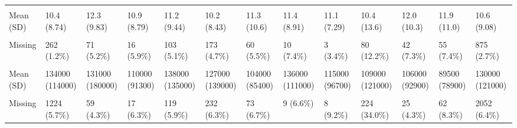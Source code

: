 \documentclass[
  single column]{article}
\begin{document}
\begin{landscape}
\begin{longtable}[t]{lllllllllllll}
\cellcolor{gray!10}{hours\_housework} & \cellcolor{gray!10}{} & \cellcolor{gray!10}{} & \cellcolor{gray!10}{} & \cellcolor{gray!10}{} & \cellcolor{gray!10}{} & \cellcolor{gray!10}{} & \cellcolor{gray!10}{} & \cellcolor{gray!10}{} & \cellcolor{gray!10}{} & \cellcolor{gray!10}{} & \cellcolor{gray!10}{} & \cellcolor{gray!10}{}\\
Mean (SD) & 10.4 (8.74) & 12.3 (9.83) & 10.9 (8.79) & 11.2 (9.44) & 10.2 (8.43) & 11.3 (10.6) & 11.4 (8.91) & 11.1 (7.29) & 10.4 (13.6) & 12.0 (10.3) & 11.9 (11.0) & 10.6 (9.08)\\
\cellcolor{gray!10}{Median [Min, Max]} & \cellcolor{gray!10}{10.0 [0, 168]} & \cellcolor{gray!10}{10.0 [0, 105]} & \cellcolor{gray!10}{10.0 [0, 80.0]} & \cellcolor{gray!10}{10.0 [0, 130]} & \cellcolor{gray!10}{8.00 [0, 168]} & \cellcolor{gray!10}{10.0 [0, 168]} & \cellcolor{gray!10}{10.0 [0, 40.0]} & \cellcolor{gray!10}{10.0 [0, 40.0]} & \cellcolor{gray!10}{7.00 [0, 168]} & \cellcolor{gray!10}{10.0 [0, 100]} & \cellcolor{gray!10}{10.0 [0, 100]} & \cellcolor{gray!10}{10.0 [0, 168]}\\
\addlinespace
Missing & 262 (1.2\%) & 71 (5.2\%) & 16 (5.9\%) & 103 (5.1\%) & 173 (4.7\%) & 60 (5.5\%) & 10 (7.4\%) & 3 (3.4\%) & 80 (12.2\%) & 42 (7.3\%) & 55 (7.4\%) & 875 (2.7\%)\\
\cellcolor{gray!10}{household\_inc} & \cellcolor{gray!10}{} & \cellcolor{gray!10}{} & \cellcolor{gray!10}{} & \cellcolor{gray!10}{} & \cellcolor{gray!10}{} & \cellcolor{gray!10}{} & \cellcolor{gray!10}{} & \cellcolor{gray!10}{} & \cellcolor{gray!10}{} & \cellcolor{gray!10}{} & \cellcolor{gray!10}{} & \cellcolor{gray!10}{}\\
Mean (SD) & 134000 (114000) & 131000 (180000) & 110000 (91300) & 138000 (135000) & 127000 (139000) & 104000 (85400) & 136000 (111000) & 115000 (96700) & 109000 (121000) & 106000 (92900) & 89500 (78900) & 130000 (121000)\\
\cellcolor{gray!10}{Median [Min, Max]} & \cellcolor{gray!10}{110000 [0, 2500000]} & \cellcolor{gray!10}{90000 [0, 4000000]} & \cellcolor{gray!10}{90000 [0, 670000]} & \cellcolor{gray!10}{110000 [0, 2800000]} & \cellcolor{gray!10}{100000 [0, 5000000]} & \cellcolor{gray!10}{80000 [0, 900000]} & \cellcolor{gray!10}{120000 [0, 700000]} & \cellcolor{gray!10}{99000 [20000, 600000]} & \cellcolor{gray!10}{90000 [0, 2000000]} & \cellcolor{gray!10}{80000 [8500, 1000000]} & \cellcolor{gray!10}{70000 [0, 900000]} & \cellcolor{gray!10}{100000 [0, 5000000]}\\
Missing & 1224 (5.7\%) & 59 (4.3\%) & 17 (6.3\%) & 119 (5.9\%) & 232 (6.3\%) & 73 (6.7\%) & 9 (6.6\%) & 8 (9.2\%) & 224 (34.0\%) & 25 (4.3\%) & 62 (8.3\%) & 2052 (6.4\%)\\

\end{longtable}
\end{landscape}
\end{document}
